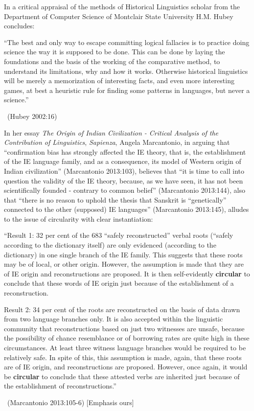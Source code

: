 In a critical appraisal of the methods of Historical Linguistics scholar from the Department of Computer Science of Montclair State University H.M. Hubey concludes:

\begin{myquote}
“The best and only way to escape committing logical fallacies is to practice doing science the way it is supposed to be done. This can be done by laying the foundations and the basis of the working of the comparative method, to understand its limitations, why and how it works. Otherwise historical linguistics will be merely a memorization of interesting facts, and even more interesting games, at best a heuristic rule for finding some patterns in languages, but never a science.” 

~\hfill (Hubey 2002:16)
\end{myquote}

In her essay \textit{The Origin of Indian Civilization - Critical Analysis of the Contribution of Linguistics}, \textit{Sapienza}, Angela Marcantonio, in arguing that “confirmation bias has strongly affected the IE theory, that is, the establishment of the IE language family, and as a consequence, its model of Western origin of Indian civilization” (Marcantonio 2013:103), believes that “it is time to call into question the validity of the IE theory, because, as we have seen, it has not been scientifically founded - contrary to common belief” (Marcantonio 2013:144), also that “there is no reason to uphold the thesis that Sanskrit is “genetically” connected to the other (supposed) IE languages” (Marcantonio 2013:145), alludes to the issue of circularity with clear instantiation:

\begin{myquote}
“Result 1: 32 per cent of the 683 “safely reconstructed” verbal roots (“safely according to the dictionary itself) are only evidenced (according to the dictionary) in one single branch of the IE family. This suggests that these roots may be of local, or other origin. However, the assumption is made that they are of IE origin and reconstructions are proposed. It is then self-evidently \textbf{circular} to conclude that these words of IE origin just because of the establishment of a reconstruction. 
\end{myquote}

\begin{myquote}
Result 2: 34 per cent of the roots are reconstructed on the basis of data drawn from two language branches only. It is also accepted within the linguistic community that reconstructions based on just two witnesses are unsafe, because the possibility of chance resemblance or of borrowing rates are quite high in these circumstances. At least three witness language branches would be required to be relatively safe. In spite of this, this assumption is made, again, that these roots are of IE origin, and reconstructions are proposed. However, once again, it would be \textbf{circular} to conclude that these attested verbs are inherited just because of the establishment of reconstructions.”

~\hfill (Marcantonio 2013:105-6) [Emphasis ours]
\end{myquote}

